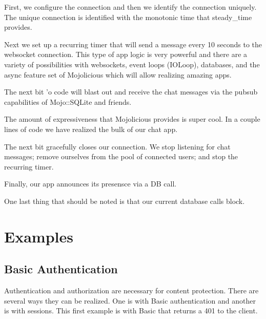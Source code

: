 \documentclass[14pt]{extreport}
\begin{document}
First, we configure the connection and then we identify the connection
uniquely.  The unique connection is identified with the monotonic time that
steady\_time provides.



Next we set up a recurring timer that will send a message every 10 seconds to
the websocket connection.  This type of app logic is very powerful and there
are a variety of possibilities with websockets, event loops (IOLoop),
databases, and the async feature set of Mojolicious which will allow realizing
amazing apps.



The next bit 'o code will blast out and receive the chat messages via the
pubsub capabilities of Mojo::SQLite and friends.



The amount of expressiveness that Mojolicious provides is super cool.  In a
couple lines of code we have realized the bulk of our chat app.

The next bit gracefully closes our connection.  We stop listening for chat
messages; remove ourselves from the pool of connected users; and stop the
recurring timer.



Finally, our app announces its presensce via a DB call.



One last thing that should be noted is that our current database calls block.

\chapter*{Examples}

\section{Basic Authentication}

Authentication and authorization are necessary for content protection.  There
are several ways they can be realized.  One is with Basic authentication and
another is with sessions.  This first example is with Basic that returns a 401
to the client.
\end{document}

